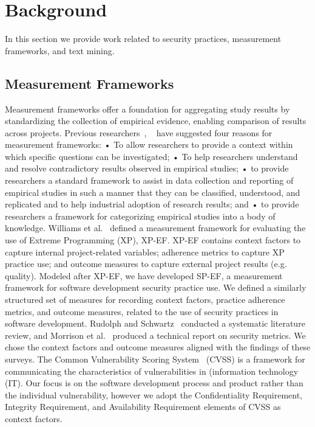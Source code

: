 \section{Background}
\label{sec:background}
In this section we provide work related to security practices, measurement frameworks, and text mining.

\subsection{Measurement Frameworks}
Measurement frameworks offer a foundation for aggregating study results by standardizing the collection of empirical evidence, enabling comparison of results across projects. Previous researchers~\cite{kitchenham1999towards}, ~\cite{williams2004toward} have suggested four reasons for measurement frameworks: 
• To allow researchers to provide a context within which specific questions can be investigated;
• To help researchers understand and resolve contradictory results observed in empirical studies;
• to provide researchers a standard framework to assist in data collection and reporting of empirical studies in such a manner that they can be classified, understood, and replicated and to help industrial adoption of research results; and
• to provide researchers a framework for categorizing empirical studies into a body of knowledge.
Williams et al.~\cite{williams2004toward} defined a measurement framework for evaluating the use of Extreme Programming (XP), XP-EF. XP-EF contains context factors to capture internal project-related variables; adherence metrics to capture XP practice use; and outcome measures to capture external project results (e.g. quality). Modeled after XP-EF, we have developed SP-EF, a measurement framework for software development security practice use. We defined a similarly structured set of measures for recording context factors, practice adherence metrics, and outcome measures, related to the use of security practices in software development.
Rudolph and Schwartz~\cite{rudolph2012critical} conducted a systematic literature review, and Morrison et al.~\cite{morrison2014mapping} produced a technical report on security metrics. We chose the context factors and outcome measures aligned with the findings of these surveys.
The Common Vulnerability Scoring System~\cite{mell2006common} (CVSS) is a framework for communicating the characteristics of vulnerabilities in  (information technology (IT). Our focus is on the software development process and product rather than the individual vulnerability, however we adopt the Confidentiality Requirement, Integrity Requirement, and Availability Requirement elements of CVSS as context factors.

